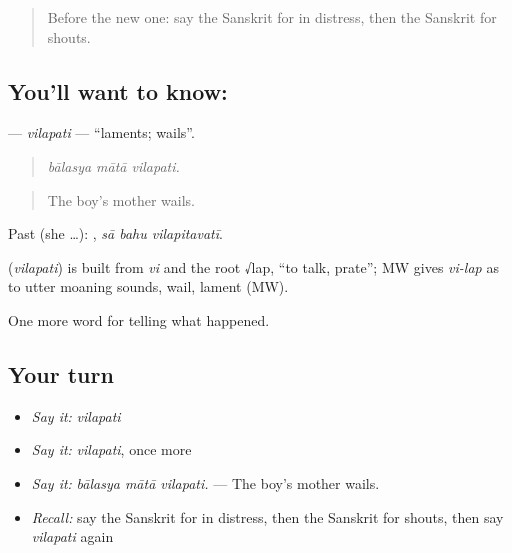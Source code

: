 \label{lesson:SA-C304-vilapati}



\begin{quote}
Before the new one: say the Sanskrit for in distress, then the Sanskrit for shouts.
\end{quote}

\subsection*{You'll want to know: }
\textbf{} — \emph{vilapati} — \textquotedblleft{}laments; wails\textquotedblright{}.

\begin{quote}
  
\end{quote}

\begin{quote}
\emph{bālasya mātā vilapati.}
\end{quote}

\begin{quote}
The boy's mother wails.
\end{quote}

Past (she …):   , \emph{sā bahu vilapitavatī}.

\begin{cousinweb}
\textbf{} (\emph{vilapati}) is built from \emph{vi} and the root √lap, \textquotedblleft{}to talk, prate\textquotedblright{}; MW gives \emph{vi-lap} as to utter moaning sounds, wail, lament (MW).
\end{cousinweb}

\begin{grammarlens}[title={What you've built}]
One more word for telling what happened.
\end{grammarlens}

\subsection*{Your turn}
\begin{itemize}
\raggedright
  \item \emph{Say it:} \emph{vilapati}
  \item \emph{Say it:} \emph{vilapati}, once more
  \item \emph{Say it:} \emph{bālasya mātā vilapati.} — The boy's mother wails.
  \item \emph{Recall:} say the Sanskrit for in distress, then the Sanskrit for shouts, then say \emph{vilapati} again
\end{itemize}

